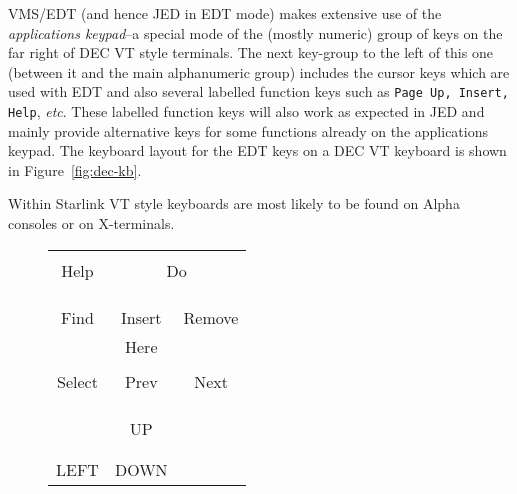 \documentclass[twoside,11pt]{starlink}
\begin{document}
VMS/EDT (and hence JED in EDT mode) makes extensive use of the
\textit{applications keypad}--a special mode of the (mostly numeric)
group of keys on the far right of DEC VT style terminals. The next
key-group to the left of this one (between it and the main alphanumeric
group) includes the cursor keys which are used with EDT and also
several labelled function keys such as \texttt{Page Up, Insert, Help},
\textit{etc}.  These labelled function keys will also work as expected
in JED and mainly provide alternative keys for some functions already
on the applications keypad. The keyboard layout for the EDT keys on a
DEC VT keyboard is shown in Figure~\ref{fig:dec-kb}.

Within Starlink VT style keyboards are most likely to be found on Alpha
consoles or on X-terminals.
\begin{figure}[t]
\scriptsize
\begin{center}
\begin{tabular}{ccc} \hline
\multicolumn{1}{|c|}{}       & \multicolumn{2}{|c|}{}  \\
\multicolumn{1}{|c|}{Help}    & \multicolumn{2}{|c|}{Do} \\
\multicolumn{1}{|c|}{}       & \multicolumn{2}{|c|}{}  \\  \hline
         &              &        \\ \hline
\multicolumn{1}{|c|}{} & \multicolumn{1}{|c|}{} & \multicolumn{1}{|c|}{} \\
\multicolumn{1}{|c|}{{Find}}    &  \multicolumn{1}{|c|}{Insert} &
\multicolumn{1}{|c|}{Remove} \\
\multicolumn{1}{|c|}{} & \multicolumn{1}{|c|}{Here} & \multicolumn{1}{|c|}{} \\
\hline
\multicolumn{1}{|c|}{} & \multicolumn{1}{|c|}{} & \multicolumn{1}{|c|}{} \\
\multicolumn{1}{|c|}{Select}    &  \multicolumn{1}{|c|}{Prev} &
\multicolumn{1}{|c|}{Next} \\
\multicolumn{1}{|c|}{} & \multicolumn{1}{|c|}{} & \multicolumn{1}{|c|}{} \\
\hline
         &              &        \\ \cline{2-2}
        & \multicolumn{1}{|c|}{}  & \\
        & \multicolumn{1}{|c|}{UP}  & \\
        & \multicolumn{1}{|c|}{}  & \\ \hline
\multicolumn{1}{|c|}{} & \multicolumn{1}{|c|}{} & \multicolumn{1}{|c|}{} \\
\multicolumn{1}{|c|}{LEFT}    &  \multicolumn{1}{|c|}{DOWN} &

\end{tabular}
\end{center}
\end{figure}
\end{document}
